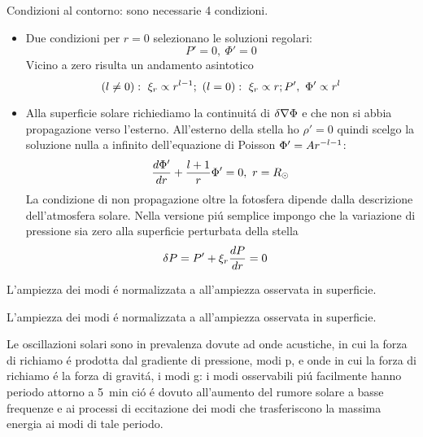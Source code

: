 \documentclass[../main.tex]{subfiles}
\begin{document}
Condizioni al contorno: sono necessarie 4 condizioni.
\begin{itemize}
\item Due condizioni per $r=0$ selezionano le soluzioni regolari:
\begin{equation}
P'=0,\ \Phi'=0
\end{equation}
Vicino a zero risulta un andamento asintotico
\begin{equation}
(l\neq0):\ \xi_r\propto r\expy{l-1};\ (l=0):\ \xi_r\propto r;P',\ \Phi'\propto r^l
\end{equation}

\item Alla superficie solare richiediamo la continuit\'a di $\Lvar{\nabla\Phi}$ e che non si abbia propagazione verso l'esterno.
All'esterno della stella ho $\rho'=0$ quindi scelgo la soluzione nulla a infinito dell'equazione di Poisson $\Phi'=Ar\expy{-l-1}$:
\begin{equation}
\TDy{r}{\Phi'}+\frac{l+1}{r}\Phi'=0,\ r=\rsun{}    
\end{equation}
La condizione di non propagazione oltre la fotosfera dipende dalla descrizione dell'atmosfera solare. Nella versione pi\'u semplice impongo che la variazione di pressione sia zero alla superficie perturbata della stella
\begin{align}
&\Lvar{P}=P'+\xi_r\TDy{r}{P}=0
\end{align}
\end{itemize}

\begin{workout}
L'ampiezza dei modi \'e normalizzata a all'ampiezza osservata in superficie. 
\end{workout}

L'ampiezza dei modi \'e normalizzata a all'ampiezza osservata in superficie. 

Le oscillazioni solari sono in prevalenza dovute ad onde acustiche, in cui la forza di richiamo \'e prodotta dal gradiente di pressione, modi p, e onde in cui la forza di richiamo \'e la forza di gravit\'a, i modi g: i modi osservabili pi\'u facilmente hanno periodo attorno a \SI{5}{\minute} ci\'o \'e dovuto all'aumento del rumore solare a basse frequenze e ai processi di eccitazione dei modi che trasferiscono la massima energia ai modi di tale periodo.
\end{document}
